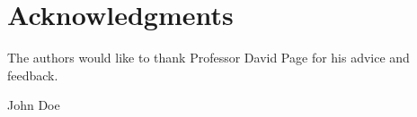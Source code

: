 \documentclass[conference]{IEEEtran}
\begin{document}
	\section*{Acknowledgments}


	The authors would like to thank Professor David Page for his advice and feedback.


	\ifCLASSOPTIONcaptionsoff
	\newpage
	\fi






	
	


	\begin{IEEEbiography}{John Doe}
		\blindtext
	\end{IEEEbiography}







\end{document}
